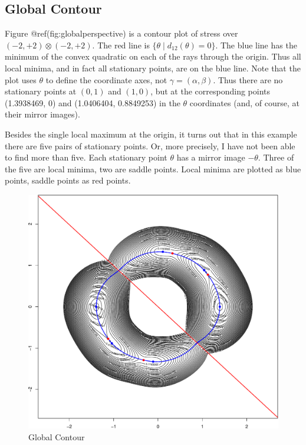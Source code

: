 \documentclass[
  12pt,
  letterpaper,
  DIV=11,
  numbers=noendperiod]{scrreprt}
\theoremstyle{remark}
\begin{document}
\subsection{Global Contour}\label{global-contour}

Figure @ref(fig:globalperspective) is a contour plot of stress over
\((-2,+2)\otimes(-2,+2)\). The red line is
\(\{\theta\mid d_{12}(\theta) = 0\}\). The blue line has the minimum of
the convex quadratic on each of the rays through the origin. Thus all
local minima, and in fact all stationary points, are on the blue line.
Note that the plot uses \(\theta\) to define the coordinate axes, not
\(\gamma=(\alpha,\beta)\). Thus there are no stationary points at
\((0,1)\) and \((1,0)\), but at the corresponding points (1.3938469, 0)
and (1.0406404, 0.8849253) in the \(\theta\) coordinates (and, of
course, at their mirror images).

Besides the single local maximum at the origin, it turns out that in
this example there are five pairs of stationary points. Or, more
precisely, I have not been able to find more than five. Each stationary
point \(\theta\) has a mirror image \(-\theta\). Three of the five are
local minima, two are saddle points. Local minima are plotted as blue
points, saddle points as red points.

\begin{figure}[H]

{\centering \includegraphics{spaces_files/figure-pdf/globalcontour-1.pdf}

}

\caption{Global Contour}

\end{figure}%
\end{document}
